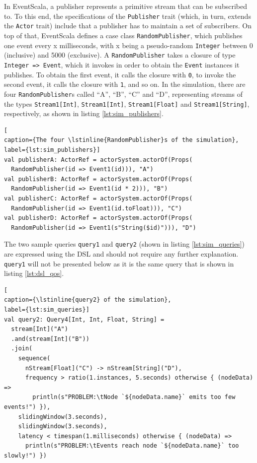\documentclass[article, 10pt, type=bsc, colorback, accentcolor=tud8b, parskip=half, bibliography=totocnumbered]{tudthesis}
\begin{document}
In EventScala, a publisher represents a primitive stream that can be subscribed to.
To this end, the specifications of the \lstinline{Publisher} trait (which, in turn, extends the \lstinline{Actor} trait) include that a publisher has to maintain a set of subscribers.
On top of that, EventScala defines a case class \lstinline{RandomPublisher}, which publishes one event every x milliseconds, with x being a pseudo-random \lstinline{Integer} between 0 (inclusive) and 5000 (exclusive).
A \lstinline{RandomPublisher} takes a closure of type \lstinline{Integer => Event}, which it invokes in order to obtain the \lstinline{Event} instances it publishes.
To obtain the first event, it calls the closure with \lstinline{0}, to invoke the second event, it calls the closure with \lstinline{1}, and so on.
In the simulation, there are four \lstinline{RandomPublisher}s called ``A'', ``B'', ``C'' and ``D'', representing streams of the types \lstinline{Stream1[Int]}, \lstinline{Stream1[Int]}, \lstinline{Stream1[Float]} and \lstinline{Stream1[String]}, respectively, as shown in listing \ref{lst:sim_publishers}.

\begin{lstlisting}[
caption={The four \lstinline{RandomPublisher}s of the simulation},
label={lst:sim_publishers}]
val publisherA: ActorRef = actorSystem.actorOf(Props(
  RandomPublisher(id => Event1(id))), "A")
val publisherB: ActorRef = actorSystem.actorOf(Props(
  RandomPublisher(id => Event1(id * 2))), "B")
val publisherC: ActorRef = actorSystem.actorOf(Props(
  RandomPublisher(id => Event1(id.toFloat))), "C")
val publisherD: ActorRef = actorSystem.actorOf(Props(
  RandomPublisher(id => Event1(s"String($id)"))), "D")
\end{lstlisting}

The two sample queries \lstinline{query1} and \lstinline{query2} (shown in listing \ref{lst:sim_queries}) are expressed using the DSL and should not require any further explanation.
\lstinline{query1} will not be presented below as it is the same query that is shown in listing \ref{lst:dsl_qos}.

\begin{lstlisting}[
caption={\lstinline{query2} of the simulation},
label={lst:sim_queries}]
val query2: Query4[Int, Int, Float, String] =
  stream[Int]("A")
  .and(stream[Int]("B"))
  .join(
    sequence(
      nStream[Float]("C") -> nStream[String]("D"),
      frequency > ratio(1.instances, 5.seconds) otherwise { (nodeData) =>
        println(s"PROBLEM:\tNode `${nodeData.name}` emits too few events!") }),
    slidingWindow(3.seconds),
    slidingWindow(3.seconds),
    latency < timespan(1.milliseconds) otherwise { (nodeData) =>
      println(s"PROBLEM:\tEvents reach node `${nodeData.name}` too slowly!") })
\end{lstlisting}
\end{document}
